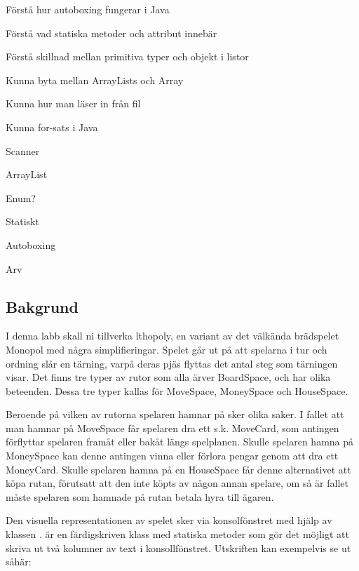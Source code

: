 

\Lab{\LabWeekELEVEN}

\begin{Goals}
\item Förstå hur autoboxing fungerar i Java
\item Förstå vad statiska metoder och attribut innebär
\item Förstå skillnad mellan primitiva typer och objekt i listor
\item Kunna byta mellan ArrayLists och Array
\item Kunna hur man läser in från fil
\item Kunna for-sats i Java
\end{Goals}

\begin{Preparations}
\item Scanner
\item ArrayList
\item Enum?
\item Statiskt
\item Autoboxing
\item Arv
\end{Preparations}

\subsection{Bakgrund}
I denna labb skall ni tillverka lthopoly, en variant av det välkända brädspelet Monopol med några simplifieringar. Spelet går ut på att spelarna i tur och ordning slår en tärning, varpå deras pjäs flyttas det antal steg som tärningen visar. Det finns tre typer av rutor som alla ärver BoardSpace, och har olika beteenden. Dessa tre typer kallas för MoveSpace, MoneySpace och HouseSpace.

Beroende på vilken av rutorna spelaren hamnar på sker olika saker. I fallet att man hamnar på MoveSpace får spelaren dra ett s.k. MoveCard, som antingen förflyttar spelaren framåt eller bakåt längs spelplanen. 
Skulle spelaren hamna på MoneySpace kan denne antingen vinna eller förlora pengar genom att dra ett MoneyCard. Skulle spelaren hamna på en HouseSpace får denne alternativet att köpa rutan, förutsatt att den inte köpts av någon annan spelare, om så är fallet måste spelaren som hamnade på rutan betala hyra till ägaren.

Den visuella representationen av spelet sker via konsolfönstret med hjälp av klassen .  är en färdigskriven klass med statiska metoder som gör det möjligt att skriva ut två kolumner av text i konsollfönstret. Utskriften kan exempelvis se ut såhär:


